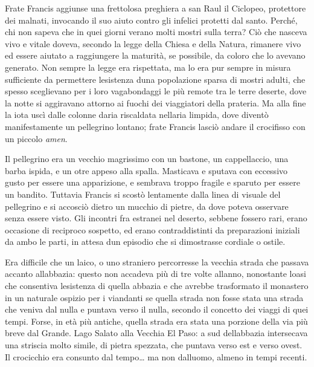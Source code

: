 Frate Francis aggiunse una frettolosa preghiera a san Raul il Ciclopeo,
protettore dei malnati, invocando il suo aiuto contro gli infelici
protetti dal santo. Perché, chi non sapeva che in quei giorni
v\textquotesingle erano molti mostri sulla terra? Ciò che nasceva vivo e
vitale doveva, secondo la legge della Chiesa e della Natura, rimanere
vivo ed essere aiutato a raggiungere la maturità, se possibile, da
coloro che lo avevano generato. Non sempre la legge era rispettata, ma
lo era pur sempre in misura sufficiente da permettere
l\textquotesingle esistenza d\textquotesingle una popolazione sparsa di
mostri adulti, che spesso sceglievano per i loro vagabondaggi le più
remote tra le terre deserte, dove la notte si aggiravano attorno ai
fuochi dei viaggiatori della prateria. Ma alla fine la iota uscì dalle
colonne d\textquotesingle aria riscaldata nell\textquotesingle aria
limpida, dove diventò manifestamente un pellegrino lontano; frate
Francis lasciò andare il crocifisso con un piccolo \emph{amen}.

Il pellegrino era un vecchio magrissimo con un bastone, un cappellaccio,
una barba ispida, e un otre appeso alla spalla. Masticava e sputava con
eccessivo gusto per essere una apparizione, e sembrava troppo fragile e
sparuto per essere un bandito. Tuttavia Francis si scostò lentamente
dalla linea di visuale del pellegrino e si accosciò dietro un mucchio di
pietre, da dove poteva osservare senza essere visto. Gli incontri fra
estranei nel deserto, sebbene fossero rari, erano occasione di reciproco
sospetto, ed erano contraddistinti da preparazioni iniziali da ambo le
parti, in attesa d\textquotesingle un episodio che si dimostrasse
cordiale o ostile.

Era difficile che un laico, o uno straniero percorresse la vecchia
strada che passava accanto all\textquotesingle abbazia: questo non
accadeva più di tre volte all\textquotesingle anno, nonostante
l\textquotesingle oasi che consentiva l\textquotesingle esistenza di
quella abbazia e che avrebbe trasformato il monastero in un naturale
ospizio per i viandanti se quella strada non fosse stata una strada che
veniva dal nulla e puntava verso il nulla, secondo il concetto dei
viaggi di quei tempi. Forse, in età più antiche, quella strada era stata
una porzione della via più breve dal Grande. Lago Salato alla Vecchia El
Paso: a sud dell\textquotesingle abbazia intersecava una striscia molto
simile, di pietra spezzata, che puntava verso est e verso ovest. Il
crocicchio era consunto dal tempo\ldots{} ma non
dall\textquotesingle uomo, almeno in tempi recenti.

